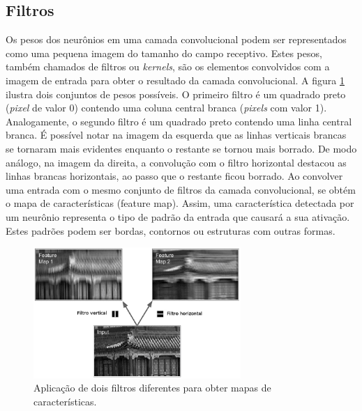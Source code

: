 \subsection{Filtros}
Os pesos dos neurônios em uma camada convolucional podem ser representados como uma pequena
imagem do tamanho do campo receptivo. Estes pesos, também chamados de filtros ou \textit{kernels}, são os elementos
convolvidos com a imagem de entrada para obter o resultado da camada convolucional.
A figura \ref{fig:conv_filt} ilustra dois conjuntos de pesos possíveis. O primeiro filtro é um quadrado preto
(\textit{pixel} de valor 0) contendo uma coluna central branca (\textit{pixels} com valor 1). 
Analogamente, o segundo filtro é um quadrado preto contendo uma linha central branca.
É possível notar na imagem da esquerda que as linhas verticais brancas se tornaram mais
evidentes enquanto o restante se tornou mais borrado. De modo análogo, na imagem da direita,
a convolução com o filtro horizontal destacou as linhas brancas horizontais, ao passo que
o restante ficou borrado. Ao convolver uma entrada com o mesmo conjunto de filtros
da camada convolucional, se obtém o mapa de características (feature map). Assim, uma
característica detectada por um neurônio representa o tipo de padrão da entrada que causará
a sua ativação. Estes padrões podem ser bordas, contornos ou estruturas com outras
formas.
\begin{figure}[htp]
\begin{center}
  \includegraphics[width=0.7\textwidth]{fig/conv_filt}
  \caption{Aplicação de dois filtros diferentes para obter mapas de características.}
  \label{fig:conv_filt}
\end{center}
\end{figure}

